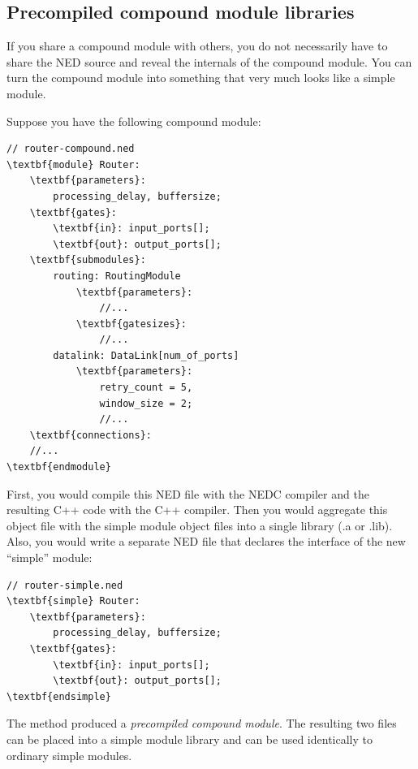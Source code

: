 \subsection{Precompiled compound module libraries}


If you share a compound module with others, you do not necessarily
have to share the NED source and reveal the internals of the compound
module. You can turn the compound module into something that very much
looks like a simple module.


Suppose you have the following compound module:


\begin{Verbatim}[commandchars=\\\{\}]
// router-compound.ned
\textbf{module} Router:
    \textbf{parameters}:
        processing_delay, buffersize;
    \textbf{gates}:
        \textbf{in}: input_ports[];
        \textbf{out}: output_ports[];
    \textbf{submodules}:
        routing: RoutingModule
            \textbf{parameters}:
                //...
            \textbf{gatesizes}:
                //...
        datalink: DataLink[num_of_ports]
            \textbf{parameters}:
                retry_count = 5,
                window_size = 2;
                //...
    \textbf{connections}:
    //...
\textbf{endmodule}
\end{Verbatim}


First, you would compile this NED file with the NEDC compiler
and the resulting C++ code with the C++ compiler. Then you would
aggregate this object file with the simple module object files
into a single library (.a or .lib). Also, you would write a separate
NED file that declares the interface of the new ``simple''
module:


\begin{Verbatim}[commandchars=\\\{\}]
// router-simple.ned
\textbf{simple} Router:
    \textbf{parameters}:
        processing_delay, buffersize;
    \textbf{gates}:
        \textbf{in}: input_ports[];
        \textbf{out}: output_ports[];
\textbf{endsimple}
\end{Verbatim}



The method produced a \textit{precompiled compound
  module}. The resulting two files
can be placed into a simple module library and
can be used identically to ordinary simple
modules.

